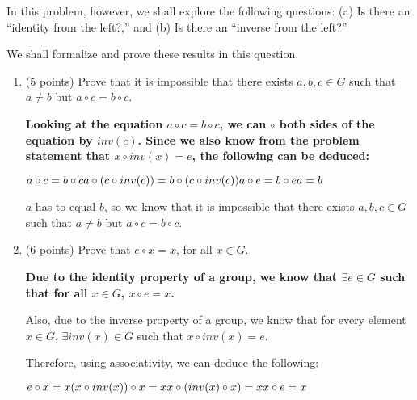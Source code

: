 \documentclass[11pt]{article}
\begin{document}
\begin{enumerate}
  In this problem, however, we shall explore the following questions: (a) Is there an ``identity from the left?,'' and (b) Is there an ``inverse from the left?'' 
  
  We shall formalize and prove these results in this question. 
  \begin{enumerate}
   \item (5 points) Prove that it is impossible that there exists $a,b,c\in G$ such that $a\neq b$ but $a\circ c = b\circ c$. \newline
  {\bfseries
      \newline
      \newline
      Looking at the equation $a\circ c = b\circ c$, we can $\circ$ both sides of the equation by $inv(c)$.  Since we also know from the problem statement that $x\circ inv(x) = e$, the following can be deduced:

      $a\circ c = b\circ c \newline
      a\circ (c\circ inv(c)) = b\circ (c\circ inv(c)) \newline
      a\circ e = b\circ e \newline
      a = b$ \newline

      $a$ has to equal $b$, so we know that it is impossible that there exists $a,b,c\in G$ such that $a \neq b$ but $a\circ c = b\circ c$.
  }
    \newpage
  \item (6 points) Prove that $e\circ x = x$, for all $x\in G$.  \newline
  {\bfseries
      \newline
      \newline
      Due to the identity property of a group, we know that $\exists e\in G$ such that for all $x \in G$, $x\circ e = x$. \newline

      Also, due to the inverse property of a group, we know that for every element $x\in G$, $\exists inv(x)\in G$ such that $x\circ inv(x) = e$. \newline

      Therefore, using associativity, we can deduce the following: \newline

      $e\circ x = x \newline
      (x\circ inv(x))\circ x = x \newline
      x\circ (inv(x)\circ x) = x \newline
      x\circ e = x$ \newline

}
\end{enumerate}
\end{enumerate}
\end{document}
